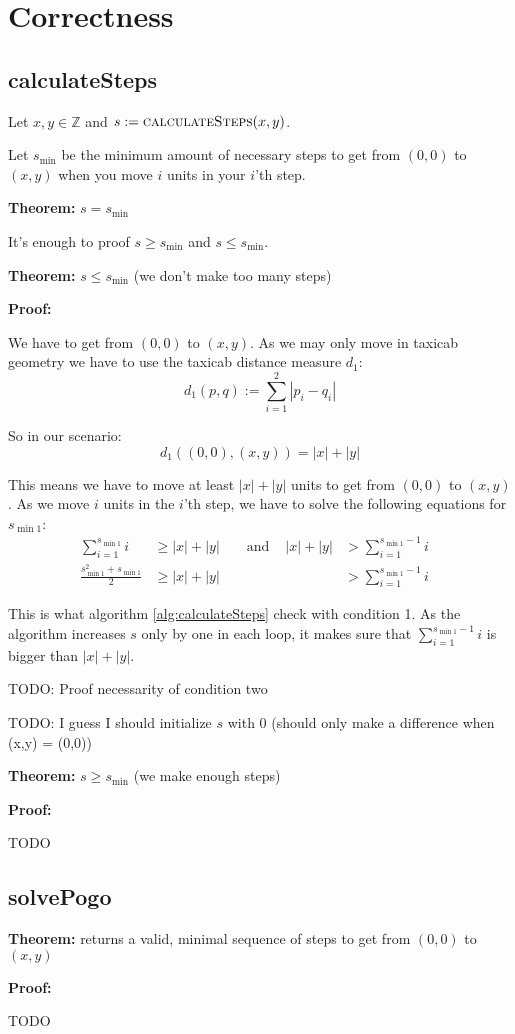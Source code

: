 \documentclass[a4paper]{scrartcl}
\newenvironment{myindentpar}[1]%
 {\begin{list}{}%
         {\setlength{\leftmargin}{#1}}%
         \item[]%
 }
 {\end{list}}
\begin{document}
\section{Correctness}
\subsection{calculateSteps}
Let $x,y \in \mathbb{Z}$ and $s := \Call{calculateSteps}{x, y}$.

Let $s_{\min}$ be the minimum amount of necessary steps to get from $(0,0)$
to $(x,y)$ when you move $i$ units in your $i$'th step.

\textbf{Theorem: } $s = s_{\min}$

It's enough to proof $s \geq s_{\min}$ and $s \leq s_{\min}$.

\begin{myindentpar}{1cm}
\textbf{Theorem: } $s \leq s_{\min}$ (we don't make too many steps)

\textbf{Proof: } 
\begin{myindentpar}{1cm}
We have to get from $(0,0)$ to $(x, y)$. As we may only move in
taxicab geometry we have to use the taxicab distance measure $d_1$:
\[d_1 \left (p, q \right ) := \sum_{i=1}^2 |p_i -q_i|\]

So in our scenario:
\[d_1 \left ((0,0), (x,y) \right ) = |x| + |y|\]

This means we have to move at least $|x| + |y|$ units to get 
from $(0,0)$ to $(x, y)$. As we move $i$ units in the $i$'th step,
we have to solve the following equations for $s_{\min1}$:
\begin{align}
    \sum_{i=1}^{s_{\min1}} i          &\geq |x| + |y| &&\text{ and } &|x| + |y|      &> \sum_{i=1}^{s_{\min1} - 1} i\\
    \frac{s_{\min1}^2 + s_{\min1}}{2} &\geq |x| + |y| &&             &               &> \sum_{i=1}^{s_{\min1} - 1} i & 
\end{align}

This is what algorithm \ref{alg:calculateSteps} check with condition 1. 
As the algorithm increases $s$ only by one in each loop, it makes 
sure that $\sum_{i=1}^{s_{\min1} - 1} i$ is bigger than $|x| + |y|$.

TODO: Proof necessarity of condition two

TODO: I guess I should initialize $s$ with 0 (should only make a difference when (x,y) = (0,0))
\end{myindentpar}

\textbf{Theorem: } $s \geq s_{\min}$ (we make enough steps)

\textbf{Proof: } 
\begin{myindentpar}{1cm}
TODO
\end{myindentpar}
\end{myindentpar}

\subsection{solvePogo}
\textbf{Theorem: }  returns a valid, minimal sequence of steps to get from $(0, 0)$ to $(x,y)$

\textbf{Proof: } 
\begin{myindentpar}{1cm}
TODO
\end{myindentpar}
\end{document}
